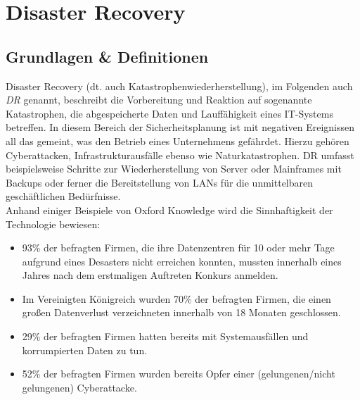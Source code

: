 \documentclass[letterpaper, 12pt]{article}
\let\tempsection\section
\renewcommand\section[1]{\vspace{-0.3cm}\tempsection{#1}\vspace{-0.3cm}}
\let\tempsubsection\subsection
\renewcommand\subsection[1]{\vspace{0cm}\tempsubsection{#1}\vspace{0cm}}
\begin{document}
\parindent 0pt
\parskip 6pt



\clearpage
\thispagestyle{empty}
\tableofcontents

\newpage
{}
\pagestyle{fancy}

\section{Disaster Recovery}

\subsection{Grundlagen \& Definitionen \cite{bookone} \cite{intro} \cite{intro2} \cite{intro3}}
Disaster Recovery (dt. auch Katastrophenwiederherstellung), im Folgenden auch \textit{DR} genannt, beschreibt die Vorbereitung und Reaktion auf sogenannte Katastrophen, die abgespeicherte Daten und Lauffähigkeit eines IT-Systems betreffen. In diesem Bereich der Sicherheitsplanung ist mit negativen Ereignissen all das gemeint, was den Betrieb eines Unternehmens gefährdet. Hierzu gehören Cyberattacken, Infrastrukturausfälle ebenso wie Naturkatastrophen. DR umfasst beispielsweise Schritte zur Wiederherstellung von Server oder Mainframes mit Backups oder ferner die Bereitstellung von LANs für die unmittelbaren geschäftlichen Bedürfnisse. \\

Anhand einiger Beispiele von Oxford Knowledge wird die Sinnhaftigkeit der Technologie bewiesen: \\

\begin{itemize}
	\item 93\% der befragten Firmen, die ihre Datenzentren für 10 oder mehr Tage aufgrund eines Desasters nicht erreichen konnten, mussten innerhalb eines Jahres nach dem erstmaligen Auftreten Konkurs anmelden.
	\item Im Vereinigten Königreich wurden 70\% der befragten Firmen, die einen großen Datenverlust verzeichneten innerhalb von 18 Monaten geschlossen.
	\item 29\% der befragten Firmen hatten bereits mit Systemausfällen und korrumpierten Daten zu tun.
	\item 52\% der befragten Firmen wurden bereits Opfer einer (gelungenen/nicht gelungenen) Cyberattacke.
\end{itemize}
\end{document}
